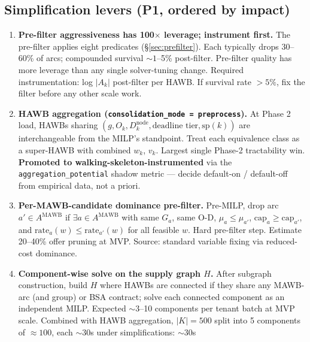 \documentclass[11pt,a4paper]{article}
\theoremstyle{definition}
\begin{document}
\subsection*{Simplification levers (P1, ordered by impact)}

\begin{enumerate}
  \item \label{item:scale-prefilter} \textbf{Pre-filter aggressiveness has
        100$\times$ leverage; instrument first.} The pre-filter applies eight
        predicates (\S\ref{sec:prefilter}). Each typically drops 30--60\% of
        arcs; compounded survival $\sim 1$--5\% post-filter. Pre-filter
        quality has more leverage than any single solver-tuning change.
        Required instrumentation: log $|A_k|$ post-filter per HAWB. If
        survival rate $> 5\%$, fix the filter before any other scale work.
  \item \label{item:scale-hawb-aggregation} \textbf{HAWB aggregation
        (\texttt{consolidation\_mode = preprocess}).} At Phase 2 load,
        HAWBs sharing $(g, O_k, D_k^{\text{node}}, \text{deadline tier},
        \text{sp}(k))$ are interchangeable from the MILP's standpoint.
        Treat each equivalence class as a super-HAWB with combined $w_k$,
        $v_k$. Largest single Phase-2 tractability win.
        \textbf{Promoted to walking-skeleton-instrumented} via the
        \texttt{aggregation\_potential} shadow metric --- decide
        default-on / default-off from empirical data, not a priori.
  \item \label{item:scale-bucket-dominance} \textbf{Per-MAWB-candidate
        dominance pre-filter.} Pre-MILP, drop arc $a' \in A^{\text{MAWB}}$
        if $\exists a \in A^{\text{MAWB}}$ with same $G_a$, same O-D,
        $\mu_a \leq \mu_{a'}$, $\text{cap}_a \geq \text{cap}_{a'}$, and
        $\text{rate}_a(w) \leq \text{rate}_{a'}(w)$ for all feasible $w$.
        Hard pre-filter step. Estimate 20--40\% offer pruning at MVP.
        Source: standard variable fixing via reduced-cost dominance.
  \item \label{item:scale-component-decomposition} \textbf{Component-wise
        solve on the supply graph $H$.} After subgraph construction, build
        $H$ where HAWBs are connected if they share any MAWB-arc (and group)
        or BSA contract; solve each connected component as an independent
        MILP. Expected $\sim 3$--10 components per tenant batch at MVP scale.
        Combined with HAWB aggregation, $|K| = 500$ split into 5 components
        of $\approx 100$, each $\sim 30$s under simplifications: $\sim 30$s

\end{enumerate}
\end{document}
